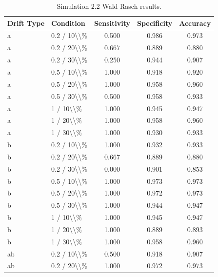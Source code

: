 \begin{table}[!h]
\centering
\caption{\label{tab:tab:sim22_rasch}Simulation 2.2 Wald Rasch results.}
\centering
\begin{tabular}[t]{llccc}
\toprule
Drift Type & Condition & Sensitivity & Specificity & Accuracy\\
\midrule
a & 0.2 / 10\textbackslash{}\textbackslash{}\% & 0.500 & 0.986 & 0.973\\
a & 0.2 / 20\textbackslash{}\textbackslash{}\% & 0.667 & 0.889 & 0.880\\
a & 0.2 / 30\textbackslash{}\textbackslash{}\% & 0.250 & 0.944 & 0.907\\
a & 0.5 / 10\textbackslash{}\textbackslash{}\% & 1.000 & 0.918 & 0.920\\
a & 0.5 / 20\textbackslash{}\textbackslash{}\% & 1.000 & 0.958 & 0.960\\
\addlinespace
a & 0.5 / 30\textbackslash{}\textbackslash{}\% & 0.500 & 0.958 & 0.933\\
a & 1 / 10\textbackslash{}\textbackslash{}\% & 1.000 & 0.945 & 0.947\\
a & 1 / 20\textbackslash{}\textbackslash{}\% & 1.000 & 0.958 & 0.960\\
a & 1 / 30\textbackslash{}\textbackslash{}\% & 1.000 & 0.930 & 0.933\\
b & 0.2 / 10\textbackslash{}\textbackslash{}\% & 1.000 & 0.932 & 0.933\\
\addlinespace
b & 0.2 / 20\textbackslash{}\textbackslash{}\% & 0.667 & 0.889 & 0.880\\
b & 0.2 / 30\textbackslash{}\textbackslash{}\% & 0.000 & 0.901 & 0.853\\
b & 0.5 / 10\textbackslash{}\textbackslash{}\% & 1.000 & 0.973 & 0.973\\
b & 0.5 / 20\textbackslash{}\textbackslash{}\% & 1.000 & 0.972 & 0.973\\
b & 0.5 / 30\textbackslash{}\textbackslash{}\% & 1.000 & 0.944 & 0.947\\
\addlinespace
b & 1 / 10\textbackslash{}\textbackslash{}\% & 1.000 & 0.945 & 0.947\\
b & 1 / 20\textbackslash{}\textbackslash{}\% & 1.000 & 0.889 & 0.893\\
b & 1 / 30\textbackslash{}\textbackslash{}\% & 1.000 & 0.958 & 0.960\\
ab & 0.2 / 10\textbackslash{}\textbackslash{}\% & 0.500 & 0.918 & 0.907\\
ab & 0.2 / 20\textbackslash{}\textbackslash{}\% & 1.000 & 0.972 & 0.973\\

\end{tabular}
\end{table}

